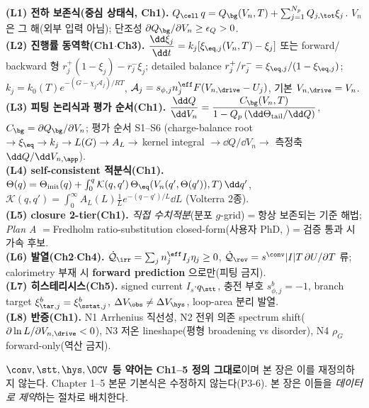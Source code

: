 \begin{linkbox}
\textbf{(L1) 전하 보존식(중심 상태식, Ch1).} $Q_\cell\,q=Q_\bg(V_n,T)+\sum_{j=1}^{N_p}Q_{j,\tot}\xi_j$. $V_n$ 은
그 해(외부 입력 아님); 단조성 $\partial Q_\bg/\partial V_n\ge\epsilon_Q>0$.\\
\textbf{(L2) 진행률 동역학(Ch1$\cdot$Ch3).} $\dfrac{\dd\xi_j}{\dd t}=k_j[\xi_{\eq,j}(V_n,T)-\xi_j]$ 또는 forward/
backward 형 $r_j^+(1-\xi_j)-r_j^-\xi_j$; detailed balance $r_j^+/r_j^-=\xi_{\eq,j}/(1-\xi_{\eq,j})$;
$k_j=k_0(T)e^{-(G-\chi_j\mathcal A_j)/RT}$, $\mathcal A_j=s_{\phi,j}n_j^{\eff}F(V_{n,\drive}-U_j)$, 기본 $V_{n,\drive}=V_n$.\\
\textbf{(L3) 피팅 논리식과 평가 순서(Ch1).} $\dfrac{\dd Q}{\dd V_n}=\dfrac{C_\bg(V_n,T)}{1-Q_p\,(\dd\Theta_\mathrm{tail}/\dd Q)}$,
$C_\bg=\partial Q_\bg/\partial V_n$; 평가 순서 S1--S6 (charge-balance root $\to\xi_{\eq}\to k_j\to L(G)\to A_L\to$
kernel integral $\to\dd Q/\dd V_n\to$ 측정축 $\dd Q/\dd V_{n,\app}$).\\
\textbf{(L4) self-consistent 적분식(Ch1).} $\Theta(q)=\Theta_\mathrm{init}(q)+\int_0^q\mathcal K(q,q')\,
\Theta_\eq(V_n(q',\Theta(q')),T)\,\dd q'$, $\mathcal K(q,q')=\int_0^\infty A_L(L)\tfrac1L e^{-(q-q')/L}\dd L$ (Volterra 2종).\\
\textbf{(L5) closure 2-tier(Ch1).} \emph{직접 수치적분}(분포 $g$-grid)$=$항상 보존되는 기준 해법; \emph{Plan A}
$=$Fredholm ratio-substitution closed-form(사용자 PhD, \cite{lee2011,son2013,jcp2017})$=$검증 통과 시 가속 후보.\\
\textbf{(L6) 발열(Ch2$\cdot$Ch4).} $\dot{\mathcal Q}_\irr=\sum_j n_j^{\eff}I_j\eta_j\ge0$, $\dot{\mathcal Q}_\rev=
s^\conv|I|T\,\partial U/\partial T$ 류; calorimetry 부재 시 \textbf{forward prediction} 으로만(피팅 금지).\\
\textbf{(L7) 히스테리시스(Ch5).} signed current $I_s$$\cdot$$q_\stt$, 충전 부호 $s_{\phi,j}^b=-1$, branch target
$\xi_{\tar,j}^b=\xi_{\sstat,j}^b$, $\Delta V_\obs\ne\Delta V_\hys$, loop-area 분리 발열.\\
\textbf{(L8) 반증(Ch1).} N1 Arrhenius 직선성, N2 전위 의존 spectrum shift($\partial\ln L/\partial V_{n,\drive}<0$),
N3 저온 lineshape(평형 broadening vs disorder), N4 $\rho_G$ forward-only(역산 금지).
\end{linkbox}
\noindent\textbf{$\conv,\stt,\hys,\OCV$ 등 약어는 Ch1--5 정의 그대로}이며 본 장은 이를 재정의하지 않는다.
Chapter 1--5 본문 기본식은 수정하지 않는다(P3-6). 본 장은 이들을 \emph{데이터로 제약}하는 절차로 배치한다.

